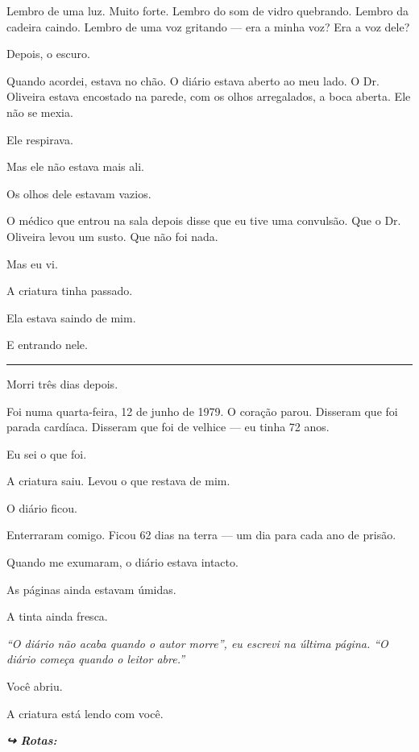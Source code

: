 \noindent Lembro de uma luz. Muito forte. Lembro do som de vidro quebrando. Lembro da cadeira caindo. Lembro de uma voz gritando --- era a minha voz? Era a voz dele?

\noindent Depois, o escuro.

\noindent Quando acordei, estava no chão. O diário estava aberto ao meu lado. O Dr. Oliveira estava encostado na parede, com os olhos arregalados, a boca aberta. Ele não se mexia.

\noindent Ele respirava.

\noindent Mas ele não estava mais ali.

\noindent Os olhos dele estavam vazios.

\noindent O médico que entrou na sala depois disse que eu tive uma convulsão. Que o Dr. Oliveira levou um susto. Que não foi nada.

\noindent Mas eu vi.

\noindent A criatura tinha passado.

\noindent Ela estava saindo de mim.

\noindent E entrando nele.

\vspace{0.5em}\noindent\rule{\textwidth}{0.5pt}\vspace{0.5em}

\noindent Morri três dias depois.

\noindent Foi numa quarta-feira, 12 de junho de 1979. O coração parou. Disseram que foi parada cardíaca. Disseram que foi de velhice --- eu tinha 72 anos.

\noindent Eu sei o que foi.

\noindent A criatura saiu. Levou o que restava de mim.

\noindent O diário ficou.

\noindent Enterraram comigo. Ficou 62 dias na terra --- um dia para cada ano de prisão.

\noindent Quando me exumaram, o diário estava intacto.

\noindent As páginas ainda estavam úmidas.

\noindent A tinta ainda fresca.

\noindent \textit{\textquotedblleft{}O diário não acaba quando o autor morre\textquotedblright{}\textit{, eu escrevi na última página. }\textquotedblleft{}O diário começa quando o leitor abre.\textquotedblright{}}

\noindent Você abriu.

\noindent A criatura está lendo com você.

\vspace{0.5em}
\noindent\textit{\textbf{↪ Rotas:}  \rotasep {} \rotasep {}}
